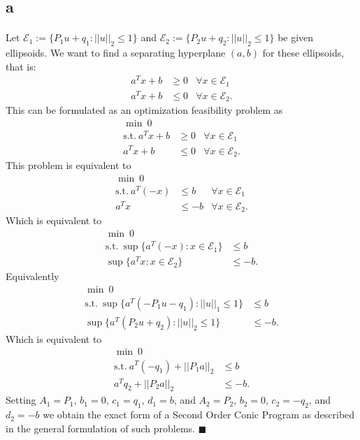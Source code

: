 \documentclass[letterpaper,12pt,oneside,onecolumn]{article}
\newcommand{\cE}{\mathcal{E}} \newcommand{\cF}{\mathcal{F}}
\begin{document}
\section{}
\subsection{a}
\paragraph{}
Let $\cE_1:= \{P_1 u + q_1 : ||u||_2 \leq 1\}$ and $\cE_2:= \{P_2 u + q_2 : ||u||_2 \leq 1\}$ be given ellipsoids. We want to find a separating hyperplane $(a,b)$ for these ellipsoids, that is:
\begin{align*}
a^Tx + b &\geq 0 &\forall x \in \cE_1 \\
a^Tx+b &\leq 0 &\forall x \in \cE_2.
\end{align*}
This can be formulated as an optimization feasibility problem as
\begin{align*}
\min\ 0\\
\text{s.t.}\ a^Tx + b &\geq 0 &\forall x \in \cE_1\\
a^Tx + b &\leq 0 &\forall x \in \cE_2.
\end{align*}
This problem is equivalent to
\begin{align*}
\min\ 0\\
\text{s.t.}\ a^T(-x)&\leq b &\forall x \in \cE_1\\
a^Tx &\leq -b &\forall x \in \cE_2.
\end{align*}
Which is equivalent to
\begin{align*}
\min\ 0\\
\text{s.t.}\  
\sup\{ a^T(-x) : x \in \cE_1\}&\leq b\\
\sup\{a^Tx : x\in \cE_2\} &\leq -b.
\end{align*}
Equivalently
\begin{align*}
\min\ 0\\
\text{s.t.}\  
\sup\{ a^T(-P_1 u - q_1) : ||u||_1 \leq 1\}&\leq b\\
\sup\{a^T(P_2 u + q_2) : ||u||_2 \leq 1\} &\leq -b.
\end{align*}
Which is equivalent to
\begin{align*}
\min\ 0\\
\text{s.t.}\  
a^T(-q_1) + ||P_1a||_2 &\leq b\\
a^Tq_2 + ||P_2a||_2 &\leq -b.
\end{align*}
Setting $A_1 = P_1$, $b_1 = 0$, $c_1=q_1$, $d_1 = b$, and $A_2 = P_2$, $b_2 = 0$, $c_2 = -q_2$, and $d_2 = -b$ we obtain the exact form of a Second Order Conic Program as described in the general formulation of such problems. $\blacksquare$
\end{document}
